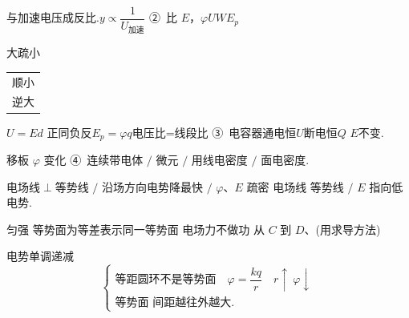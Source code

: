 与加速电压成反比.\quad $y\propto\dfrac{1}{U_{\text{加速}}}$
②\ 比 $E$，$\varphi$\quad $U$\quad $W$\quad $E_{p}$

大疏小\quad \begin{tabular}[t]{@{}l@{}}顺小\\逆大\end{tabular}\quad $U=Ed$ 正同负反\quad $E_{p}=\varphi q$\quad 电压比=线段比
③\ 电容器\quad 通电恒$U$\quad 断电恒$Q$ $E$不变.

移板 $\varphi$ 变化\quad
{}
\quad
{}
④\ 连续带电体 $/$ 微元 $/$ 用线电密度 $/$ 面电密度.

电场线$\perp$等势线 $/$ 沿场方向电势降最快 $/$ $\varphi$、$E$ 疏密 电场线 等势线 $/$ $E$ 指向低电势.

匀强 等势面为等差表示\qquad 同一等势面 电场力不做功
从 $C$ 到 $D$、(用求导方法)

电势单调递减
\[
\left\{\begin{array}{l}
\text{等距圆环不是等势面}\quad \varphi=\dfrac{kq}{r}\quad r\uparrow\ \varphi\downarrow\\[3ex]
\text{等势面 间距越往外越大.}
\end{array}\right.
\]
